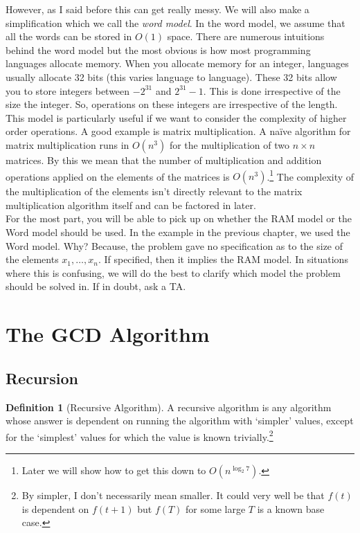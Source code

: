 \documentclass[11pt]{article}
\theoremstyle{plain}
\theoremstyle{definition}
\newtheorem{defn}[thm]{Definition} %
\numberwithin{equation}{section}
\numberwithin{figure}{section}
\begin{document}
\noindent However, as I said before this can get really messy. We will also make a simplification which we call the \emph{word model}. In the word model, we assume that all the words can be stored in $O(1)$ space. There are numerous intuitions behind the word model but the most obvious is how most programming languages allocate memory. When you allocate memory for an integer, languages usually allocate 32 bits (this varies language to language). These 32 bits allow you to store integers between $-2^{31}$ and $2^{31} - 1$. This is done irrespective of the size the integer. So, operations on these integers are irrespective of the length. \\

\noindent This model is particularly useful if we want to consider the complexity of higher order operations. A good example is matrix multiplication. A na\"ive algorithm for matrix multiplication runs in $O(n^3)$ for the multiplication of two $n \times n$ matrices. By this we mean that the number of multiplication and addition operations applied on the elements of the matrices is $O(n^3)$.\footnote{Later we will show how to get this down to $O(n^{\log_2 7})$.} The complexity of the multiplication of the elements isn't directly relevant to the matrix multiplication algorithm itself and can be factored in later. \\

\noindent For the most part, you will be able to pick up on whether the RAM model or the Word model should be used. In the example in the previous chapter, we used the Word model. Why? Because, the problem gave no specification as to the size of the elements $x_1, \ldots, x_n$. If specified, then it implies the RAM model. In situations where this is confusing, we will do the best to clarify which model the problem should be solved in. If in doubt, ask a TA.







\newpage
\section{The GCD Algorithm}

\subsection{Recursion}

\begin{defn}[Recursive Algorithm]
A recursive algorithm is any algorithm whose answer is dependent on running the algorithm with `simpler' values, except for the `simplest' values for which the value is known trivially.\footnote{By simpler, I don't necessarily mean smaller. It could very well be that $f(t)$ is dependent on $f(t + 1)$ but $f(T)$ for some large $T$ is a known base case.}
\end{defn}
\end{document}

